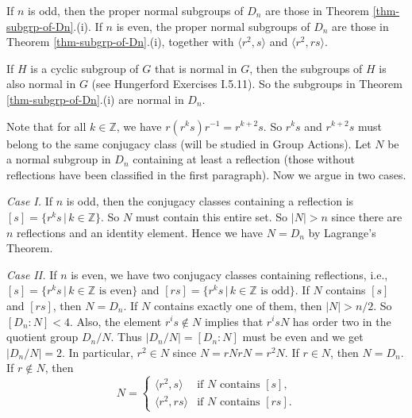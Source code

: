 \begin{theorem} \label{thm-normal-subgrp-of-Dn}
	If $n$ is odd, then the proper normal subgroups of $D_n$ are those in Theorem \ref{thm-subgrp-of-Dn}.(i). If $n$ is even, the proper normal subgroups of $D_n$ are those in Theorem \ref{thm-subgrp-of-Dn}.(i), together with $\langle r^2,s\rangle$ and $\langle r^2,rs\rangle$.
\end{theorem}
\begin{sketch}
	If $H$ is a cyclic subgroup of $G$ that is normal in $G$, then the subgroups of $H$ is also normal in $G$ (see Hungerford Exercises I.5.11). So the subgroups in Theorem \ref{thm-subgrp-of-Dn}.(i) are normal in $D_n$.
	
	Note that for all $k\in \mathbb{Z}$, we have $r(r^ks)r^{-1} = r^{k+2}s$. So $r^ks$ and $r^{k+2}s$ must belong to the same  conjugacy class (will be studied in Group Actions). Let $N$ be a normal subgroup in $D_n$ containing at least a reflection (those without reflections have been classified in the first paragraph). Now we argue in two cases.
	
	\noindent\textit{Case I.} If $n$ is odd, then the conjugacy classes containing a reflection is $[s]=\{r^ks\,|\, k\in\mathbb{Z}\}$. So $N$ must contain this entire set. So $|N| > n$ since there are $n$ reflections and an identity element. Hence we have $N = D_{n}$ by Lagrange's Theorem.
	
	\noindent\textit{Case II.} If $n$ is even, we have two conjugacy classes containing reflections, i.e., $[s] = \{r^ks\,|\, k\in\mathbb{Z}\text{ is even}\}$ and $[rs] =\{r^ks\,|\, k\in\mathbb{Z}\text{ is odd}\}$. If $N$ contains $[s]$ and $[rs]$, then $N = D_n$. If $N$ contains exactly one of them, then $|N|>n/2$. So $[D_n:N] < 4$. Also, the element $r^is\not\in N$ implies that $r^isN$ has order two in the quotient group $D_n/N$. Thus $|D_n/N|=[D_n:N]$ must be even and we get $|D_n/N| = 2$. In particular, $r^2\in N$ since $N= rNrN = r^2N$. If $r\in N$, then $N = D_n$. If $r\not\in N$, then 
	\begin{equation*}
		N = \begin{cases}
			\langle r^2, s\rangle &\text{if }N\text{ contains }[s],
			\\
			\langle r^2, rs\rangle &\text{if }N\text{ contains }[rs].
		\end{cases}
	\end{equation*}
\end{sketch}


